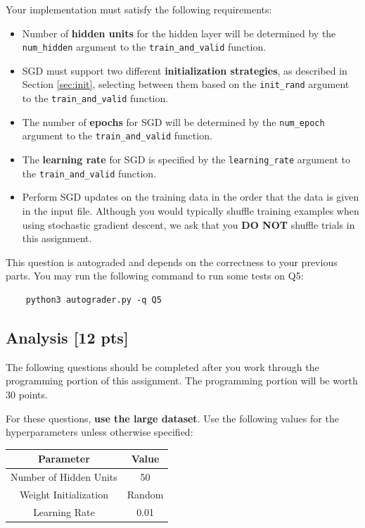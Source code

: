Your implementation must satisfy the following requirements:
\begin{itemize}
    \item Number of {\bf hidden units} for the hidden layer will be determined by the \texttt{num\_hidden} argument to the \texttt{train\_and\_valid} function.
    \item SGD must support two different {\bf initialization strategies}, as described in Section \ref{sec:init}, selecting between them based on the \texttt{init\_rand} argument to the \texttt{train\_and\_valid} function.
    \item The number of {\bf epochs} for SGD will be determined by the \texttt{num\_epoch} argument to the \texttt{train\_and\_valid} function.
    \item The {\bf learning rate} for SGD is specified by the \texttt{learning\_rate} argument to the \texttt{train\_and\_valid} function.
    \item Perform SGD updates on the training data in the order that the data is given in the input file. Although you would typically shuffle training examples when using stochastic gradient descent, we ask that you {\bf DO NOT} shuffle trials in this assignment.
\end{itemize}
\vspace{0.1in}
This question is autograded and depends on the correctness to your previous parts. You may run the following command to run some tests on Q5:
\begin{verbatim}
    python3 autograder.py -q Q5
\end{verbatim}
\vspace{0.3in}

\subsection{Analysis [12 pts]}
The following questions should be completed after you work through the programming portion of this assignment. The programming portion will be worth 30 points. 

For these questions, \textbf{use the large dataset}. Use the following values for the hyperparameters unless otherwise specified:

\begin{center}
    \begin{tabular}{|c|c|}
        \hline
        \textbf{Parameter} & \textbf{Value} \\
        \hline
        Number of Hidden Units & 50 \\
        \hline
        Weight Initialization & {\sc Random} \\
        \hline
        Learning Rate & 0.01 \\
        \hline
    \end{tabular}
\end{center}



